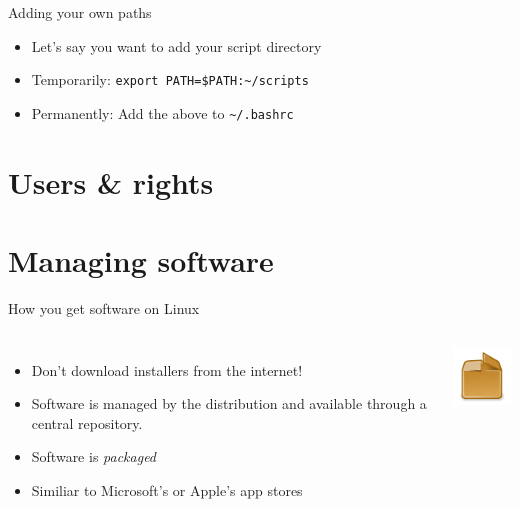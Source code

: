     \begin{frame}[t,fragile]{Adding your own paths}
        \begin{itemize}
            \item Let's say you want to add your script directory
            \item Temporarily: \texttt{export PATH=\$PATH:\textasciitilde/scripts}
            \item Permanently: Add the above to \texttt{\textasciitilde/.bashrc}
        \end{itemize}
    \end{frame}

    \section{Users \& rights}

    \section{Managing software}

    \begin{frame}[t,fragile]{How you get software on Linux}
        \begin{columns}[T]
            \begin{itemize}
                \item Don't download installers from the internet!
                \item Software is managed by the distribution and available
                    through a central repository.
                \item Software is \emph{packaged}
                \item Similiar to Microsoft's or Apple's app stores
            \end{itemize}
            \vspace{-1cm}
            \begin{center}
                \includegraphics[width=0.7\columnwidth]{img/package-icon.pdf}
            \end{center}
        \end{columns}
    \end{frame}

